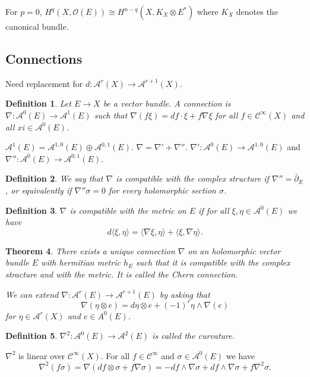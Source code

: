 \documentclass[12pt]{article}
\theoremstyle{darkgreentheorem}
\newtheorem{thm}{Theorem}[section]
\theoremstyle{darkbluedefinition}
\newtheorem{defn}[thm]{Definition}
\theoremstyle{darkredexample}
\theoremstyle{remark}
\newcommand{\1}{\mathbbm{1}}
\newcommand{\A}{\mathscr{A}}
\newcommand{\calC}{\mathcal{C}}
\renewcommand{\O}{\mathcal{O}}
\newcommand{\ot}{\otimes}
\newcommand{\op}{\oplus}
\begin{document}
For $p=0$, $H^{q}(X,\O(E))\cong H^{n-q}(X,K_{X}\ot E^{*})$ where $K_{X}$ denotes the canonical bundle.

\subsection{Connections}

Need replacement for $d\colon \A^{r}(X)\to \A^{r+1}(X)$.

\begin{defn}
    Let $E\to X$ be a vector bundle.
    A \textit{connection} is $\nabla \colon \A^{0}(E)\to \A^{1}(E)$ such that $\nabla(f\xi)=df\cdot \xi + f\nabla \xi$ for all $f\in \calC^{\infty}(X)$ and all $xi\in \A^{0}(E)$.
\end{defn}

$\A^{1}(E)=\A^{1,0}(E)\op \A^{0,1}(E)$.
$\nabla =\nabla'+ \nabla''$.
$\nabla'\colon \A^{0}(E)\to \A^{1,0}(E)$ and $\nabla''\colon \A^{0}(E)\to \A^{0,1}(E)$.

\begin{defn}
    We say that $\nabla $ is compatible with the complex structure if $\nabla''=\bar{\partial}_{E}$, or equivalently if $\nabla''\sigma=0$ for every holomorphic section $\sigma$.
\end{defn}

\begin{defn}
    $\nabla$ is compatible with the metric on $E$ if for all $\xi,\eta\in \A^{0}(E)$ we have
    \[ d\langle \xi ,\eta \rangle =\langle \nabla \xi ,\eta\rangle + \langle \xi,\nabla\eta \rangle.\]
\end{defn}

\begin{thm}
    There exists a unique connection $\nabla$ on an holomorphic vector bundle $E$ with hermitian metric $h_{E}$ such that it is compatible with the complex stracture and with the metric.
    It is called the \textit{Chern connection}.

    We can extend $\nabla \colon \A^{r}(E)\to \A^{r+1}(E)$ by asking that
    \[ \nabla(\eta\ot e)=d\eta \ot e+(-1)^{r}\eta \wedge \nabla(e) \]
    for $\eta \in \A^{r}(X)$ and $e\in A^{0}(E)$.
\end{thm}

\begin{defn}
    $\nabla^{2}\colon \A^{0}(E)\to \A^{2}(E)$ is called the \textit{curvature}.
\end{defn}

$\nabla^{2}$ is linear over $\calC^{\infty}(X)$.
For all $f\in \calC^{\infty}$ and $\sigma \in \A^{0}(E)$ we have
\[ \nabla^{2}(f\sigma)=\nabla(df\ot \sigma + f\nabla \sigma)=-df\wedge \nabla\sigma +df\wedge \nabla \sigma +f\nabla^{2}\sigma.\]
\end{document}
